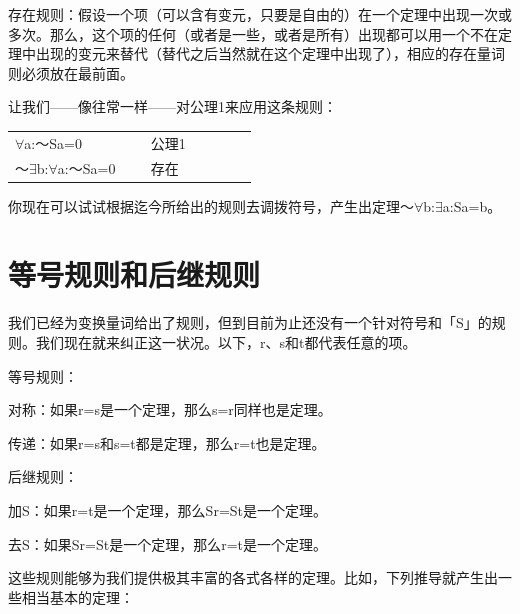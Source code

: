 \documentclass[
  12pt,
  twoside,
  openright,
  oldfontcommands,
]{memoir}
\begin{document}
存在规则：假设一个项（可以含有变元，只要是自由的）在一个定理中出现一次或多次。那么，这个项的任何（或者是一些，或者是所有）出现都可以用一个不在定理中出现的变元来替代（替代之后当然就在这个定理中出现了），相应的存在量词则必须放在最前面。

让我们------像往常一样------对公理1来应用这条规则：

\begin{longtable}[]{>{\raggedright\arraybackslash}p{0.47\linewidth} >{\raggedright\arraybackslash}p{0.47\linewidth}}
\toprule\noalign{}
\endhead
\bottomrule\noalign{}
\endlastfoot
$\forall$a:～Sa=0 & 　公理1 \\
～$\exists$b:$\forall$a:～Sa=0 & 　存在 \\
\end{longtable}

你现在可以试试根据迄今所给出的规则去调拨符号，产生出定理～$\forall$b:$\exists$a:Sa=b。

\section{等号规则和后继规则}

我们已经为变换量词给出了规则，但到目前为止还没有一个针对符号和「S」的规则。我们现在就来纠正这一状况。以下，r、s和t都代表任意的项。

等号规则：

对称：如果r=s是一个定理，那么s=r同样也是定理。

传递：如果r=s和s=t都是定理，那么r=t也是定理。

后继规则：

加S：如果r=t是一个定理，那么Sr=St是一个定理。

去S：如果Sr=St是一个定理，那么r=t是一个定理。

这些规则能够为我们提供极其丰富的各式各样的定理。比如，下列推导就产生出一些相当基本的定理：
\end{document}

